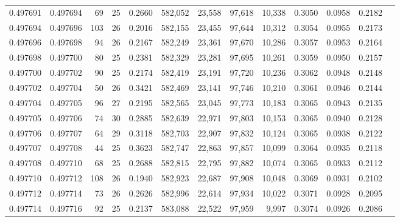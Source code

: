 \begin{tabular}{rrrrrrrrrrrrr}
0.497691 & 0.497694 &  69 &  25 &                                     0.2660 & 582,052 &  23,558 &  97,618 &  10,338 & 0.3050 & 0.0958 & 0.2182 \\
0.497694 & 0.497696 & 103 &  26 &                                     0.2016 & 582,155 &  23,455 &  97,644 &  10,312 & 0.3054 & 0.0955 & 0.2173 \\
0.497696 & 0.497698 &  94 &  26 &                                     0.2167 & 582,249 &  23,361 &  97,670 &  10,286 & 0.3057 & 0.0953 & 0.2164 \\
0.497698 & 0.497700 &  80 &  25 &                                     0.2381 & 582,329 &  23,281 &  97,695 &  10,261 & 0.3059 & 0.0950 & 0.2157 \\
0.497700 & 0.497702 &  90 &  25 &                                     0.2174 & 582,419 &  23,191 &  97,720 &  10,236 & 0.3062 & 0.0948 & 0.2148 \\
0.497702 & 0.497704 &  50 &  26 &                                     0.3421 & 582,469 &  23,141 &  97,746 &  10,210 & 0.3061 & 0.0946 & 0.2144 \\
0.497704 & 0.497705 &  96 &  27 &                                     0.2195 & 582,565 &  23,045 &  97,773 &  10,183 & 0.3065 & 0.0943 & 0.2135 \\
0.497705 & 0.497706 &  74 &  30 &                                     0.2885 & 582,639 &  22,971 &  97,803 &  10,153 & 0.3065 & 0.0940 & 0.2128 \\
0.497706 & 0.497707 &  64 &  29 &                                     0.3118 & 582,703 &  22,907 &  97,832 &  10,124 & 0.3065 & 0.0938 & 0.2122 \\
0.497707 & 0.497708 &  44 &  25 &                                     0.3623 & 582,747 &  22,863 &  97,857 &  10,099 & 0.3064 & 0.0935 & 0.2118 \\
0.497708 & 0.497710 &  68 &  25 &                                     0.2688 & 582,815 &  22,795 &  97,882 &  10,074 & 0.3065 & 0.0933 & 0.2112 \\
0.497710 & 0.497712 & 108 &  26 &                                     0.1940 & 582,923 &  22,687 &  97,908 &  10,048 & 0.3069 & 0.0931 & 0.2102 \\
0.497712 & 0.497714 &  73 &  26 &                                     0.2626 & 582,996 &  22,614 &  97,934 &  10,022 & 0.3071 & 0.0928 & 0.2095 \\
0.497714 & 0.497716 &  92 &  25 &                                     0.2137 & 583,088 &  22,522 &  97,959 &   9,997 & 0.3074 & 0.0926 & 0.2086 \\

\end{tabular}
